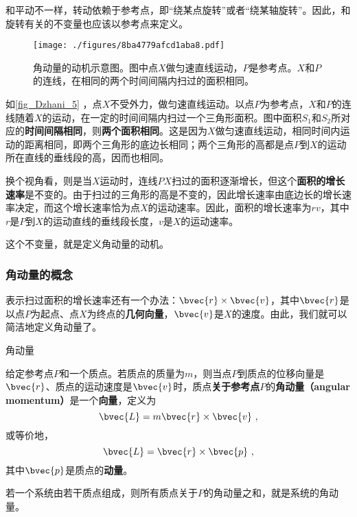 和平动不一样，转动依赖于参考点，即“绕某点旋转”或者“绕某轴旋转”。因此，和旋转有关的不变量也应该以参考点来定义。


\begin{figure}[ht]
\centering
\texttt{[image: ./figures/8ba4779afcd1aba8.pdf]}
\caption{角动量的动机示意图。图中点$X$做匀速直线运动，$P$是参考点。$X$和$P$的连线，在相同的两个时间间隔内扫过的面积相同。} \label{fig_Dzhani_5}
\end{figure}


如\autoref{fig_Dzhani_5} ，点$X$不受外力，做匀速直线运动。以点$P$为参考点，$X$和$P$的连线随着$X$的运动，在一定的时间间隔内扫过一个三角形面积。图中面积$S_1$和$S_2$所对应的\textbf{时间间隔相同}，则\textbf{两个面积相同}。这是因为$X$做匀速直线运动，相同时间内运动的距离相同，即两个三角形的底边长相同；两个三角形的高都是点$P$到$X$的运动所在直线的垂线段的高，因而也相同。



换个视角看，则是当$X$运动时，连线$PX$扫过的面积逐渐增长，但这个\textbf{面积的增长速率}是不变的。由于扫过的三角形的高是不变的，因此增长速率由底边长的增长速率决定，而这个增长速率恰为点$X$的运动速率。因此，面积的增长速率为$rv$，其中$r$是$P$到$X$的运动直线的垂线段长度，$v$是$X$的运动速率。


这个不变量，就是定义角动量的动机。



\subsubsection{角动量的概念}





表示扫过面积的增长速率还有一个办法：$\bvec{r}\times \bvec{v}$，其中$\bvec{r}$是以点$P$为起点、点$X$为终点的\textbf{几何向量}，$\bvec{v}$是$X$的速度。由此，我们就可以简洁地定义角动量了。


\begin{definition}{角动量}

给定参考点$P$和一个质点。若质点的质量为$m$，则当点$P$到质点的位移向量是$\bvec{r}$、质点的运动速度是$\bvec{v}$时，质点\textbf{关于参考点}$P$的\textbf{角动量（angular momentum）}是一个\textbf{向量}，定义为
\begin{equation}
\bvec{L} = m\bvec{r}\times \bvec{v}~, 
\end{equation}
或等价地，
\begin{equation}
\bvec{L} = \bvec{r}\times\bvec{p}~, 
\end{equation}
其中$\bvec{p}$是质点的\textbf{动量}。

若一个系统由若干质点组成，则所有质点关于$P$的角动量之和，就是系统的角动量。

\end{definition}



